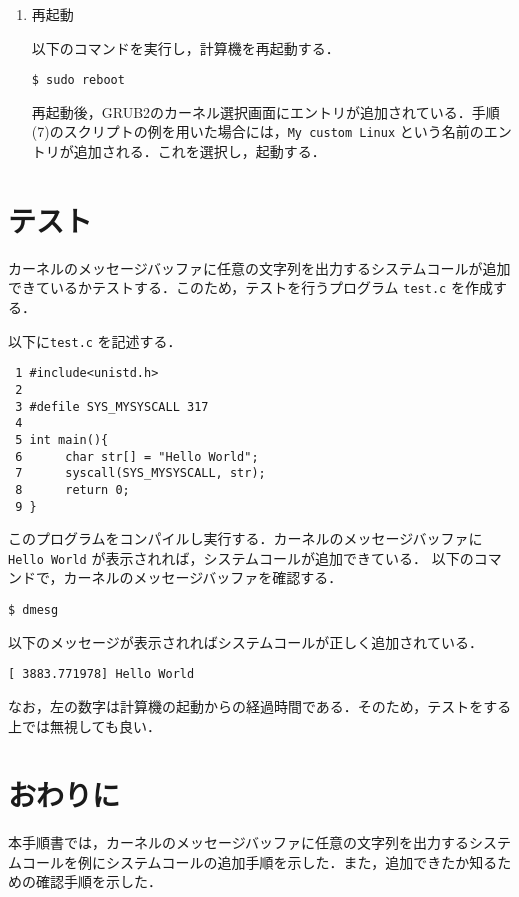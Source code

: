 \documentclass[12pt]{jsarticle}
\begin{document}
\begin{enumerate}
\begin{enumerate}
\end{enumerate}

\item 再起動

以下のコマンドを実行し，計算機を再起動する．
\begin{verbatim}
$ sudo reboot
\end{verbatim}
再起動後，GRUB2のカーネル選択画面にエントリが追加されている．手順(7)のスクリプトの例を用いた場合には，\verb|My custom Linux| という名前のエントリが追加される．これを選択し，起動する．


\end{enumerate}




\section{テスト}\label{sec:test}

カーネルのメッセージバッファに任意の文字列を出力するシステムコールが追加できているかテストする．このため，テストを行うプログラム \verb|test.c| を作成する．

以下に\verb|test.c| を記述する．
\begin{verbatim}
 1 #include<unistd.h>
 2
 3 #defile SYS_MYSYSCALL 317
 4
 5 int main(){
 6      char str[] = "Hello World";
 7      syscall(SYS_MYSYSCALL, str);
 8      return 0;
 9 }
\end{verbatim}
このプログラムをコンパイルし実行する．カーネルのメッセージバッファに\verb|Hello World| が表示されれば，システムコールが追加できている．
以下のコマンドで，カーネルのメッセージバッファを確認する．
\begin{verbatim}
$ dmesg
\end{verbatim}
以下のメッセージが表示されればシステムコールが正しく追加されている．
\begin{verbatim}
[ 3883.771978] Hello World
\end{verbatim}
なお，左の数字は計算機の起動からの経過時間である．そのため，テストをする上では無視しても良い．

\section{おわりに}\label{sec:conclusion}
本手順書では，カーネルのメッセージバッファに任意の文字列を出力するシステムコールを例にシステムコールの追加手順を示した．また，追加できたか知るための確認手順を示した．
\end{document}
